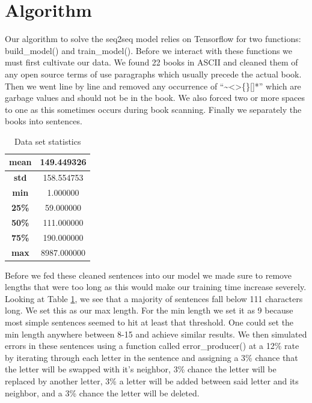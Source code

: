 \documentclass[11pt,a4paper]{scrartcl}
\theoremstyle{definition}
\begin{document}
\section{Algorithm}
Our algorithm to solve the seq2seq model relies on Tensorflow for two functions: build\_model() and train\_model(). Before we interact with these functions we must first cultivate our data. We found 22 books in ASCII and cleaned them of any open source terms of use paragraphs which usually precede the actual book. Then we went line by line and removed any occurrence of “\textasciitilde<>\{\}[]*” which are garbage values and should not be in the book. We also forced two or more spaces to one as this sometimes occurs during book scanning. Finally we separately the books into sentences.\newline

\FloatBarrier
\begin{table}
\begin{center}
\begin{tabular}{ |c|c|} 
\hline
\textbf{mean} & 149.449326 \\
\hline
\textbf{std} & 158.554753 \\
\hline
\textbf{min} & 1.000000 \\
\hline
\textbf{25\%} & 59.000000 \\
\hline
\textbf{50\%} & 111.000000 \\
\hline
\textbf{75\%} & 190.000000 \\
\hline
\textbf{max} & 8987.000000 \\
\hline
\end{tabular}
\caption{Data set statistics} 
\label{datastats}
\end{center}
\end{table}

Before we fed these cleaned sentences into our model we made sure to remove lengths that were too long as this would make our training time increase severely. Looking at Table \ref{datastats}, we see that a majority of sentences fall below 111 characters long. We set this as our max length. For the min length we set it as 9 because most simple sentences seemed to hit at least that threshold. One could set the min length anywhere between 8-15 and achieve similar results. We then simulated errors in these sentences using a function called error\_producer() at a 12\% rate by iterating through each letter in the sentence and assigning a 3\% chance that the letter will be swapped with it’s neighbor, 3\% chance the letter will be replaced by another letter, 3\% a letter will be added between said letter and its neighbor, and a 3\% chance the letter will be deleted.
\end{document}
